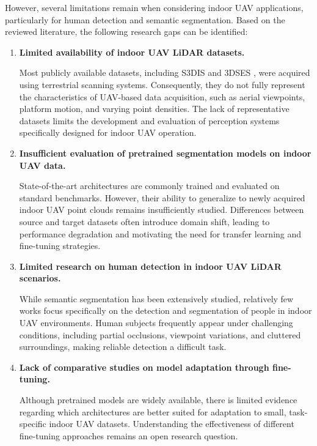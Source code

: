 However, several limitations remain when considering indoor UAV applications, particularly for human detection and semantic segmentation. Based on the reviewed literature, the following research gaps can be identified:

\begin{enumerate}

\item \textbf{Limited availability of indoor UAV LiDAR datasets.}

Most publicly available datasets, including S3DIS \cite{Armeni2016S3DIS} and 3DSES \cite{Merizette2025ThreeDSES}, were acquired using terrestrial scanning systems. Consequently, they do not fully represent the characteristics of UAV-based data acquisition, such as aerial viewpoints, platform motion, and varying point densities. The lack of representative datasets limits the development and evaluation of perception systems specifically designed for indoor UAV operation.

\item \textbf{Insufficient evaluation of pretrained segmentation models on indoor UAV data.}

State-of-the-art architectures are commonly trained and evaluated on standard benchmarks. However, their ability to generalize to newly acquired indoor UAV point clouds remains insufficiently studied. Differences between source and target datasets often introduce domain shift, leading to performance degradation and motivating the need for transfer learning and fine-tuning strategies.

\item \textbf{Limited research on human detection in indoor UAV LiDAR scenarios.}

While semantic segmentation has been extensively studied, relatively few works focus specifically on the detection and segmentation of people in indoor UAV environments. Human subjects frequently appear under challenging conditions, including partial occlusions, viewpoint variations, and cluttered surroundings, making reliable detection a difficult task.

\item \textbf{Lack of comparative studies on model adaptation through fine-tuning.}

Although pretrained models are widely available, there is limited evidence regarding which architectures are better suited for adaptation to small, task-specific indoor UAV datasets. Understanding the effectiveness of different fine-tuning approaches remains an open research question.

\end{enumerate}

